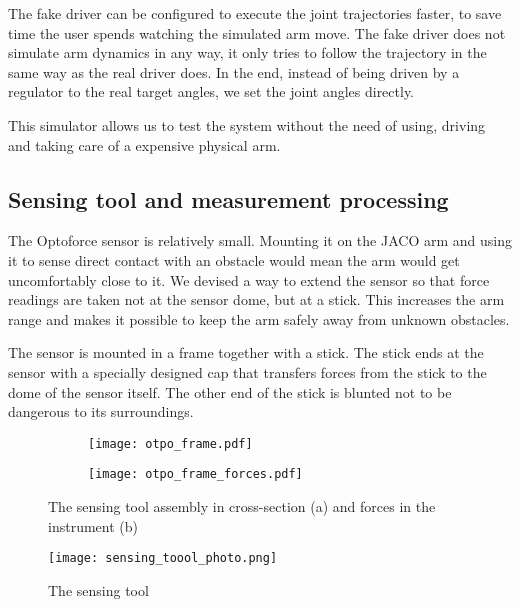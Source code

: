 \documentclass[buriama8_dp.tex]{subfiles}
\begin{document}
The fake driver can be configured to execute the joint trajectories faster, to save time the user spends watching the simulated arm move. The fake driver does not simulate arm dynamics in any way, it only tries to follow the trajectory in the same way as the real driver does. In the end, instead of being driven by a regulator to the real target angles, we set the joint angles directly.

This simulator allows us to test the system without the need of using, driving and taking care of a expensive physical arm.


\subsection{Sensing tool and measurement processing}
\label{subsec:sense_tool}

The Optoforce sensor is relatively small. Mounting it on the JACO arm and using it to sense direct contact with an obstacle would mean the arm would get uncomfortably close to it. We devised a way to extend the sensor so that force readings are taken not at the sensor dome, but at a stick. This increases the arm range and makes it possible to keep the arm safely away from unknown obstacles.

The sensor is mounted in a frame together with a stick. The stick ends at the sensor with a specially designed cap that transfers forces from the stick to the dome of the sensor itself. The other end of the stick is blunted not to be dangerous to its surroundings.

\begin{figure}[htp]
  \centering

  \begin{subfigure}[t]{0.44\textwidth}
   \texttt{[image: otpo\_frame.pdf]}
   \caption{\label{fig:opto_frame}}
  \end{subfigure}
  \begin{subfigure}[t]{0.44\textwidth}
   \texttt{[image: otpo\_frame\_forces.pdf]}
   \caption{\label{fig:frame_forces}}
  \end{subfigure}

 \caption[Sensing tool]{The sensing tool assembly in cross-section (a) and forces in the instrument (b)}
 \label{fig:opto_frame_fig}
\end{figure}


\begin{figure}[htp]
  \centering
  \texttt{[image: sensing\_toool\_photo.png]}
  \caption{The sensing tool}
  \label{fig:tool_photo} 
\end{figure}
\end{document}
